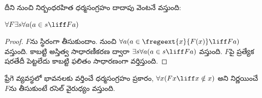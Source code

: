 \documentclass[../../../include/open-logic-section]{subfiles}
\begin{document}
దీని నుంచి నిర్బంధరహిత ధర్మసంగ్రహం దాదాపు వెంటనే వస్తుంది:

\begin{lem}
$\forall F \exists s \forall a (a \in s \liff Fa)$
\end{lem}

\begin{proof}
$F$ను స్థిరంగా తీసుకుందాం.
 నుంచి
$\forall a (a \in
\fregeext{x}{F(x)} \liff Fa)$
వస్తుంది. కాబట్టి అస్తిత్వ
సాధారణీకరణ ద్వారా
$\exists s\forall a(a \in s \liff Fa)$ వస్తుంది.
$F$పై ప్రత్యేక షరతేదీ పెట్టలేదు కాబట్టి ఫలితం సాధారణంగా వర్తిస్తుంది.
\end{proof}

ఫ్రేగె వ్యవస్థలో భావనలకు వర్తించే ధర్మసంగ్రహం ప్రకారం,
$\forall x(Fx \liff x \notin x)$
అని నిర్ణయించే $F$ను
తీసుకుంటే రసెల్ వైరుధ్యం
వస్తుంది.
\end{document}
